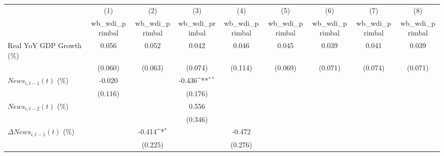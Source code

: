 {
\def\sym#1{\ifmmode^{#1}\else\(^{#1}\)\fi}
\begin{tabular}{l*{8}{c}}
\toprule
                    &\multicolumn{1}{c}{(1)}&\multicolumn{1}{c}{(2)}&\multicolumn{1}{c}{(3)}&\multicolumn{1}{c}{(4)}&\multicolumn{1}{c}{(5)}&\multicolumn{1}{c}{(6)}&\multicolumn{1}{c}{(7)}&\multicolumn{1}{c}{(8)}\\
                    &\multicolumn{1}{c}{wb_wdi_primbal}&\multicolumn{1}{c}{wb_wdi_primbal}&\multicolumn{1}{c}{wb_wdi_primbal}&\multicolumn{1}{c}{wb_wdi_primbal}&\multicolumn{1}{c}{wb_wdi_primbal}&\multicolumn{1}{c}{wb_wdi_primbal}&\multicolumn{1}{c}{wb_wdi_primbal}&\multicolumn{1}{c}{wb_wdi_primbal}\\
\midrule
Real YoY GDP Growth (\%)&       0.056         &       0.052         &       0.042         &       0.046         &       0.045         &       0.039         &       0.041         &       0.039         \\
                    &     (0.060)         &     (0.063)         &     (0.074)         &     (0.114)         &     (0.069)         &     (0.071)         &     (0.074)         &     (0.071)         \\
\addlinespace
$ News_{i,t-1}(t)$ (\%)&      -0.020         &                     &      -0.436\sym{**} &                     &                     &                     &                     &                     \\
                    &     (0.116)         &                     &     (0.176)         &                     &                     &                     &                     &                     \\
\addlinespace
$ News_{i,t-2}(t)$ (\%)&                     &                     &       0.556         &                     &                     &                     &                     &                     \\
                    &                     &                     &     (0.346)         &                     &                     &                     &                     &                     \\
\addlinespace
$ \Delta News_{i,t-1}(t)$ (\%)&                     &      -0.414\sym{*}  &                     &      -0.472         &                     &                     &                     &                     \\
                    &                     &     (0.225)         &                     &     (0.276)         &                     &                     &                     &                     \\

\end{tabular}}
